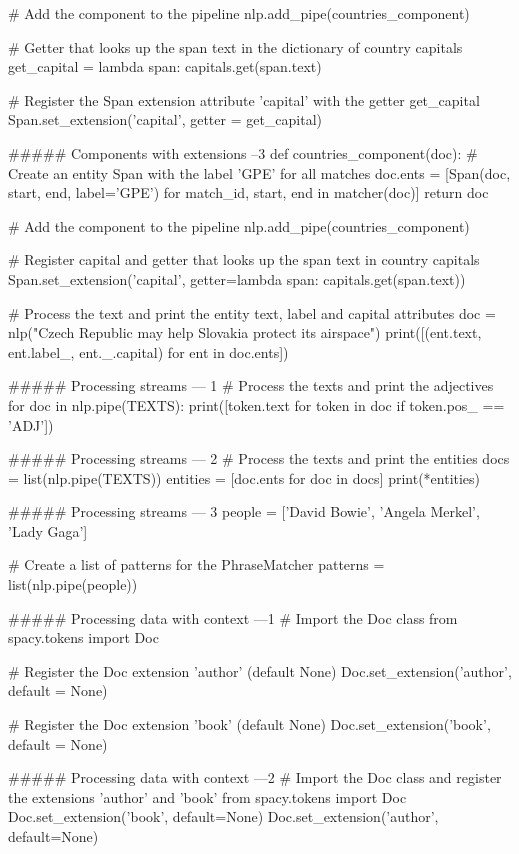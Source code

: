 # Add the component to the pipeline
nlp.add_pipe(countries_component)

# Getter that looks up the span text in the dictionary of country capitals
get_capital = lambda span: capitals.get(span.text)

# Register the Span extension attribute 'capital' with the getter get_capital 
Span.set_extension('capital', getter = get_capital)

##### Components with extensions --3
def countries_component(doc):
    # Create an entity Span with the label 'GPE' for all matches
    doc.ents = [Span(doc, start, end, label='GPE')
                for match_id, start, end in matcher(doc)]
    return doc

# Add the component to the pipeline
nlp.add_pipe(countries_component)

# Register capital and getter that looks up the span text in country capitals
Span.set_extension('capital', getter=lambda span: capitals.get(span.text))

# Process the text and print the entity text, label and capital attributes
doc = nlp("Czech Republic may help Slovakia protect its airspace")
print([(ent.text, ent.label_, ent._.capital) for ent in doc.ents])

##### Processing streams --- 1
# Process the texts and print the adjectives
for doc in nlp.pipe(TEXTS):
    print([token.text for token in doc if token.pos_ == 'ADJ'])


##### Processing streams --- 2
# Process the texts and print the entities
docs = list(nlp.pipe(TEXTS))
entities = [doc.ents for doc in docs]
print(*entities)

##### Processing streams --- 3
people = ['David Bowie', 'Angela Merkel', 'Lady Gaga']

# Create a list of patterns for the PhraseMatcher
patterns = list(nlp.pipe(people))


##### Processing data with context  ---1
# Import the Doc class
from spacy.tokens import Doc

# Register the Doc extension 'author' (default None)
Doc.set_extension('author', default = None)

# Register the Doc extension 'book' (default None)
Doc.set_extension('book', default = None)


##### Processing data with context  ---2
# Import the Doc class and register the extensions 'author' and 'book'
from spacy.tokens import Doc
Doc.set_extension('book', default=None)
Doc.set_extension('author', default=None)

